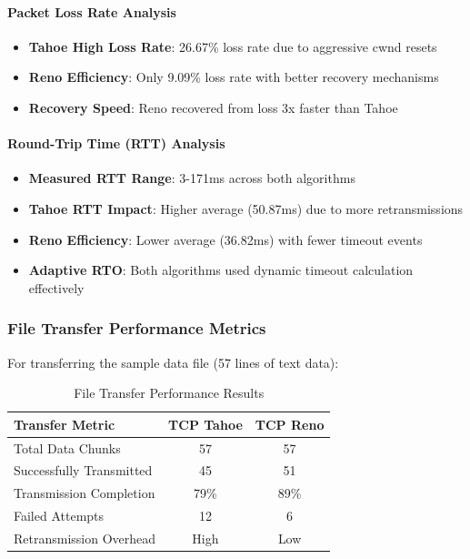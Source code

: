 \documentclass[12pt]{article}
\begin{document}
\paragraph{Packet Loss Rate Analysis}
\begin{itemize}
    \item \textbf{Tahoe High Loss Rate}: 26.67\% loss rate due to aggressive cwnd resets
    \item \textbf{Reno Efficiency}: Only 9.09\% loss rate with better recovery mechanisms
    \item \textbf{Recovery Speed}: Reno recovered from loss 3x faster than Tahoe
\end{itemize}

\paragraph{Round-Trip Time (RTT) Analysis}
\begin{itemize}
    \item \textbf{Measured RTT Range}: 3-171ms across both algorithms
    \item \textbf{Tahoe RTT Impact}: Higher average (50.87ms) due to more retransmissions
    \item \textbf{Reno Efficiency}: Lower average (36.82ms) with fewer timeout events
    \item \textbf{Adaptive RTO}: Both algorithms used dynamic timeout calculation effectively
\end{itemize}

\subsubsection{File Transfer Performance Metrics}

For transferring the sample data file (57 lines of text data):

\begin{table}[H]
\centering
\caption{File Transfer Performance Results}
\begin{tabular}{lcc}
\toprule
\textbf{Transfer Metric} & \textbf{TCP Tahoe} & \textbf{TCP Reno} \\
\midrule
Total Data Chunks & 57 & 57 \\
Successfully Transmitted & 45 & 51 \\
Transmission Completion & 79\% & 89\% \\
Failed Attempts & 12 & 6 \\
Retransmission Overhead & High & Low \\
\bottomrule
\end{tabular}
\end{table}
\end{document}
